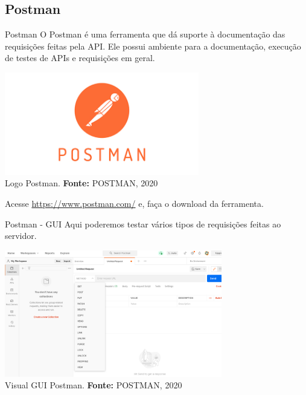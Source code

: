 \documentclass{beamer}
\begin{document}
 \subsection{Postman}
    \begin{frame}{Postman}
 	O Postman é uma ferramenta que dá suporte à documentação das requisições feitas pela API. Ele possui ambiente para a documentação, execução de testes de APIs e requisições em geral.
        
         \begin{center}
    	\includegraphics[width=85mm]{resources/aula4_13.png}\\
        \tiny{ Logo Postman. \textbf{Fonte:} POSTMAN, 2020}
     \end{center}   
      Acesse \href{https://www.postman.com/}{https://www.postman.com/} e, faça o download da ferramenta.
    \end{frame}    
    \begin{frame}{Postman - GUI}
 	Aqui poderemos testar vários tipos de requisições feitas ao servidor.
        
         \begin{center}
    	\includegraphics[width=95mm]{resources/aula4_14.png}\\
        \tiny{ Visual GUI Postman. \textbf{Fonte:} POSTMAN, 2020}
     \end{center}   
    \end{frame}    


%
%
  
\end{document}
